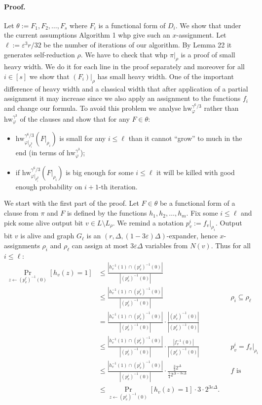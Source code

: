 \paragraph{Proof.} Let $\theta:=F_1,F_2,\ldots,F_s$ where $F_i$ is a functional form of $D_i$.
We show that under the current assumptions Algorithm 1 whp give such an $x$-assignment. Let $\ell:=\varepsilon^3r/32$ be the number of iterations of our algorithm. By Lemma 22 it generates self-reduction $\rho$. We have to check that whp $\pi|_\rho$ is a proof of small heavy width. We do it for each line in the proof separately and moreover for all $i\in[s]$ we show that $(F_i)|_\rho$ has small heavy width.
One of the important difference of heavy width and a classical width that after application of a partial assignment it may increase since we also apply an assignment to the functions $f_i$ and change our formula. To avoid this problem we analyse $\mathrm{hw}_{\varphi}^{\gamma^6/3}$ rather than $\mathrm{hw}_{\varphi}^{\gamma^3}$ of the clauses and show that for any $F\in\theta$:
\begin{itemize}
\item $\mathrm{hw}_{\varphi|_{\rho_i^y}}^{\gamma^6/3}(F|_{\rho_i})$ is small for any $i\leq\ell$ than it cannot ``grow'' to much in the end (in terms of $\mathrm{hw}_{\varphi}^{\gamma^3}$);
\item if $\mathrm{hw}_{\varphi|_{\rho_i^y}}^{\gamma^6/3}(F|_{\rho_i})$ is big enough for some $i\leq\ell$ it will be killed with good enough probability on $i+1$-th iteration.
\end{itemize}
We start with the first part of the proof. Let $F\in\theta$ be a functional form of a clause from $\pi$ and $F$ is defined by the functions $h_1,h_2,\ldots,h_m$. Fix some $i\leq\ell$ and pick some alive output bit $v\in L\setminus L_\rho$. We remind a notation $p_v^i:=f_v|_{\rho_i}$. Output bit $v$ is alive and graph $G_\ell$ is an $(r,\Delta,(1-3\varepsilon)\Delta)$-expander, hence $x$-assignments $\rho_i$ and $\rho_\ell$ can assign at most $3\varepsilon\Delta$ variables from $N(v)$. Thus for all $i\leq\ell$:
\begin{align*}
\Pr_{z\leftarrow(p_v^\ell)^{-1}(0)}[h_v(z)=1]
&\leq\frac{|h_v^{-1}(1)\cap(p_v^\ell)^{-1}(0)|}{|(p_v^\ell)^{-1}(0)|}\\
&\leq\frac{|h_v^{-1}(1)\cap(p_v^i)^{-1}(0)|}{|(p_v^\ell)^{-1}(0)|}&&\rho_i\subseteq\rho_\ell\\
&=\frac{|h_v^{-1}(1)\cap(p_v^i)^{-1}(0)|}{|(p_v^i)^{-1}(0)|}\cdot\frac{|(p_v^i)^{-1}(0)|}{|(p_v^\ell)^{-1}(0)|}\\
&\leq\frac{|h_v^{-1}(1)\cap(p_v^i)^{-1}(0)|}{|(p_v^i)^{-1}(0)|}\cdot\frac{|f_v^{-1}(0)|}{|(p_v^\ell)^{-1}(0)|}&&p_v^i=f_v|_{\rho_i}\\
&\leq\frac{|h_v^{-1}(1)\cap(p_v^i)^{-1}(0)|}{|(p_v^i)^{-1}(0)|}\cdot\frac{\frac342^\Delta}{\frac142^{\Delta-3\varepsilon\Delta}}&&f\text{ is balanced}\\
&\leq\Pr_{z\leftarrow(p_v^i)^{-1}(0)}[h_v(z)=1]\cdot3\cdot2^{3\varepsilon\Delta}.
\end{align*}
